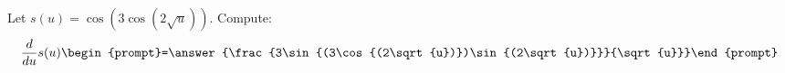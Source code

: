 \documentclass{ximera}
\author{Bart Snapp\and Nela Lakos}
\begin{document}
\begin{exercise}
Let $s(u) = \cos \left(3 \cos \left(2  \sqrt{u}\right)\right)$. Compute:
\[
\dd{u}s(u)
\begin{prompt}=\answer{\frac{3\sin{(3\cos{(2\sqrt{u})})\sin{(2\sqrt{u})}}}{\sqrt{u}}}\end{prompt}
\]
\end{exercise}
\end{document}
